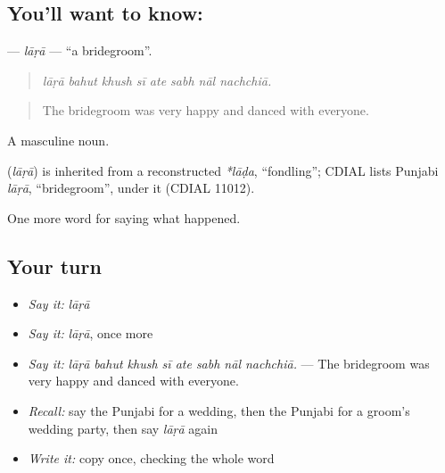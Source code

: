 \subsection*{You'll want to know: }
\textbf{} — \emph{lāṛā} — \textquotedblleft{}a bridegroom\textquotedblright{}.

\begin{quote}
       
\end{quote}

\begin{quote}
\emph{lāṛā bahut khush sī ate sabh nāl nachchiā.}
\end{quote}

\begin{quote}
The bridegroom was very happy and danced with everyone.
\end{quote}

A masculine noun.

\begin{cousinweb}
\textbf{} (\emph{lāṛā}) is inherited from a reconstructed \emph{*lāḍa}, \textquotedblleft{}fondling\textquotedblright{}; CDIAL lists Punjabi \emph{lāṛā}, \textquotedblleft{}bridegroom\textquotedblright{}, under it (CDIAL 11012).
\end{cousinweb}

\begin{grammarlens}[title={What you've built}]
One more word for saying what happened.
\end{grammarlens}

\subsection*{Your turn}
\begin{itemize}
\raggedright
  \item \emph{Say it:} \emph{lāṛā}
  \item \emph{Say it:} \emph{lāṛā}, once more
  \item \emph{Say it:} \emph{lāṛā bahut khush sī ate sabh nāl nachchiā.} — The bridegroom was very happy and danced with everyone.
  \item \emph{Recall:} say the Punjabi for a wedding, then the Punjabi for a groom's wedding party, then say \emph{lāṛā} again
  \item \emph{Write it:} copy \textbf{} once, checking the whole word
\end{itemize}

